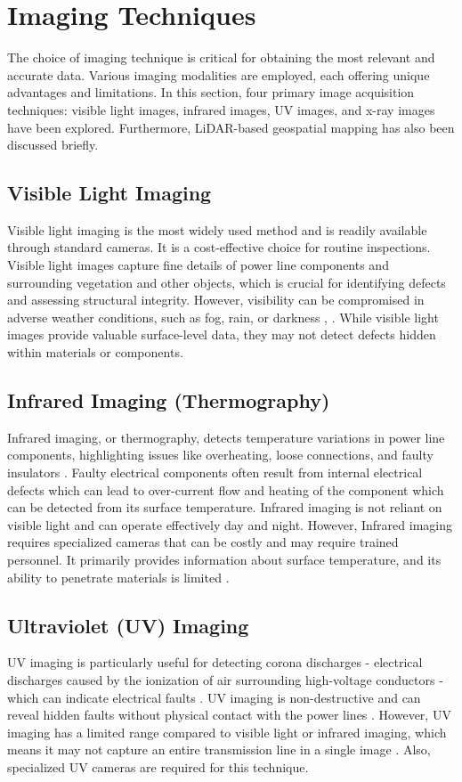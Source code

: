 \section{Imaging Techniques}\label{sec:imaging}
The choice of imaging technique is critical for obtaining the most relevant and accurate data. Various imaging modalities are employed, each offering unique advantages and limitations. In this section, four primary image acquisition techniques: visible light images, infrared images, UV images, and x-ray images have been explored. Furthermore, LiDAR-based geospatial mapping has also been discussed briefly.

\subsection{Visible Light Imaging}
Visible light imaging is the most widely used method and is readily available through standard cameras. It is a cost-effective choice for routine inspections. Visible light images capture fine details of power line components and surrounding vegetation and other objects, which is crucial for identifying defects and assessing structural integrity. However, visibility can be compromised in adverse weather conditions, such as fog, rain, or darkness \cite{zhang_study_2023}, \cite{zhang_finet_2022}. While visible light images provide valuable surface-level data, they may not detect defects hidden within materials or components.

\subsection{Infrared Imaging (Thermography)}
Infrared imaging, or thermography, detects temperature variations in power line components, highlighting issues like overheating, loose connections, and faulty insulators \cite{singh_design_2021}. Faulty electrical components often result from internal electrical defects which can lead to over-current flow and heating of the component which can be detected from its surface temperature. Infrared imaging is not reliant on visible light and can operate effectively day and night. However, Infrared imaging requires specialized cameras that can be costly and may require trained personnel. It primarily provides information about surface temperature, and its ability to penetrate materials is limited \cite{jaffery_design_2014}.

\subsection{Ultraviolet (UV) Imaging}
UV imaging is particularly useful for detecting corona discharges - electrical discharges caused by the ionization of air surrounding high-voltage conductors - which can indicate electrical faults \cite{hu_new_2012}. UV imaging is non-destructive and can reveal hidden faults without physical contact with the power lines \cite{li_image_2019}. However, UV imaging has a limited range compared to visible light or infrared imaging, which means it may not capture an entire transmission line in a single image \cite{zang_status_2008}. Also, specialized UV cameras are required for this technique.

